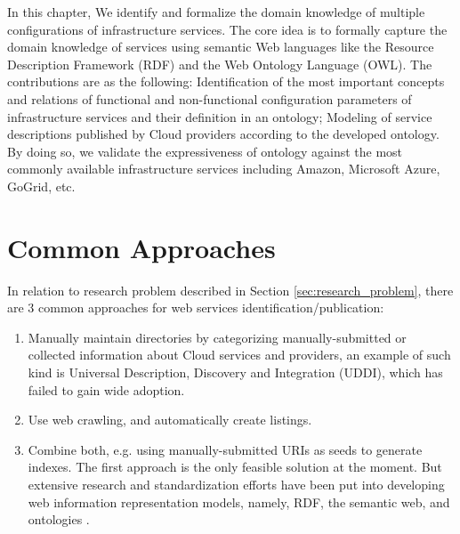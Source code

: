 In this chapter, We identify and formalize the domain knowledge of multiple
configurations of infrastructure services. The core idea is to
formally capture the domain knowledge of services using
semantic Web languages like the Resource Description
Framework (RDF) and the Web Ontology Language (OWL).
The contributions are as the following:
Identification of the most important concepts and
relations of functional and non-functional
configuration parameters of infrastructure services
and their definition in an ontology;
Modeling of service descriptions published by
Cloud providers according to the developed
ontology. By doing so, we validate the
expressiveness of ontology against the most
commonly available infrastructure services
including Amazon, Microsoft Azure, GoGrid, etc.


\section{Common Approaches}
In relation to research problem described in Section \ref{sec:research_problem}, there are 3 common approaches for web services identification/publication: 
\begin{enumerate}
    \item Manually maintain directories by categorizing manually-submitted or collected information about Cloud services and providers, an example of such kind is Universal Description, Discovery and Integration (UDDI), which has failed to gain wide adoption.
    \item Use web crawling, and automatically create listings.
    \item Combine both, e.g. using manually-submitted URIs as seeds to generate indexes. The first approach is the only feasible solution at the moment. But extensive research and standardization efforts have been put into developing web information representation models, namely, RDF, the semantic web, and ontologies \cite{Al-Hamdani2003}.
\end{enumerate}

